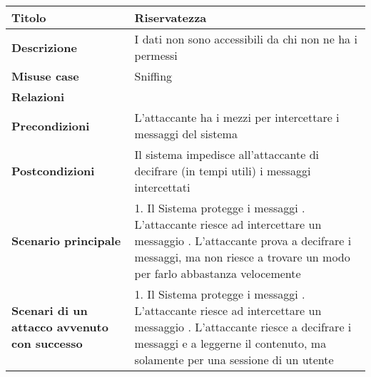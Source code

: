 \begin{tabular} {|P{4cm}|P{13cm}|}
  \hline
  \textbf{Titolo}                                      & Riservatezza                                                    \\
  \hline
  \textbf{Descrizione}                                 & I dati non sono accessibili da chi non ne ha i permessi         \\
  \hline
  \textbf{Misuse case}                                 & Sniffing                                                        \\
  \hline
  \textbf{Relazioni}                                   &                                                                 \\
  \hline
  \textbf{Precondizioni}                               & L'attaccante ha i mezzi per intercettare i messaggi del sistema \\
  \hline
  \textbf{Postcondizioni}                              & Il sistema impedisce all'attaccante di decifrare
  (in tempi utili) i messaggi intercettati                                                                               \\
  \hline
  \textbf{Scenario principale}                         & 1. Il Sistema protegge i messaggi . L'attaccante riesce ad intercettare un messaggio . L'attaccante prova
  a decifrare i messaggi, ma non riesce a trovare un modo per farlo abbastanza
  velocemente                                                                                                            \\
  \hline
  \textbf{Scenari di un attacco avvenuto con successo} & 1. Il Sistema protegge
  i messaggi . L'attaccante riesce ad intercettare un messaggio . L'attaccante riesce a decifrare i messaggi e a leggerne il contenuto, ma
  solamente per una sessione di un utente                                                                                \\
  \hline
\end{tabular}
\hfill
\break

